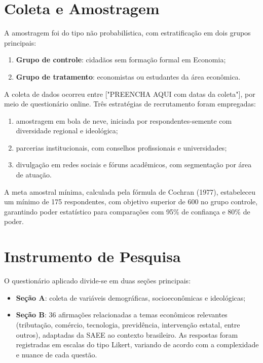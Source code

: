 \section{Coleta e Amostragem}

A amostragem foi do tipo não probabilística, com estratificação em dois grupos principais:
\begin{enumerate}[label=\alph*)]
    \item \textbf{Grupo de controle}: cidadãos sem formação formal em Economia;
    \item \textbf{Grupo de tratamento}: economistas ou estudantes da área econômica.
\end{enumerate}

A coleta de dados ocorreu entre ["PREENCHA AQUI com datas da coleta"], por meio de questionário online. Três estratégias de recrutamento foram empregadas:

\begin{enumerate}[label=\alph*)]
    \item amostragem em bola de neve, iniciada por respondentes-semente com diversidade regional e ideológica;
    \item parcerias institucionais, com conselhos profissionais e universidades;
    \item divulgação em redes sociais e fóruns acadêmicos, com segmentação por área de atuação.
\end{enumerate}

A meta amostral mínima, calculada pela fórmula de Cochran (1977), estabeleceu um mínimo de 175 respondentes, com objetivo superior de 600 no grupo controle, garantindo poder estatístico para comparações com 95\% de confiança e 80\% de poder.

\section{Instrumento de Pesquisa}

O questionário aplicado divide-se em duas seções principais:
\begin{itemize}
    \item \textbf{Seção A}: coleta de variáveis demográficas, socioeconômicas e ideológicas;
    \item \textbf{Seção B}: 36 afirmações relacionadas a temas econômicos relevantes (tributação, comércio, tecnologia, previdência, intervenção estatal, entre outros), adaptadas da SAEE ao contexto brasileiro. As respostas foram registradas em escalas do tipo Likert, variando de acordo com a complexidade e nuance de cada questão.
\end{itemize}

